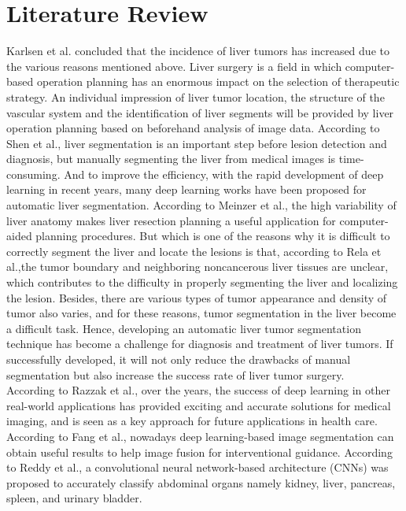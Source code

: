 \documentclass[12pt, a4paper]{article}
\begin{document}
\section{Literature Review}

\setlength{\parindent}{1em}
Karlsen et al.\cite{1} concluded that the incidence of liver tumors has increased due to the various reasons mentioned above. Liver surgery is a field in which computer-based operation planning has an enormous impact on the selection of therapeutic strategy. An individual impression of liver tumor location, the structure of the vascular system and the identification of liver segments will be provided by liver operation planning based on beforehand analysis of image data. According to Shen et al.\cite{2}, liver segmentation is an important step before lesion detection and diagnosis, but manually segmenting the liver from medical images is time-consuming. And to improve the efficiency, with the rapid development of deep learning in recent years, many deep learning works have been proposed for automatic liver segmentation. According to Meinzer et al.\cite{3}, the high variability of liver anatomy makes liver resection planning a useful application for computer-aided planning procedures. But which is one of the reasons why it is difficult to correctly segment the liver and locate the lesions is that, according to Rela et al.\cite{4},the tumor boundary and neighboring noncancerous liver tissues are unclear, which contributes to the difficulty in properly segmenting the liver and localizing the lesion. Besides, there are various types of tumor appearance and density of tumor also varies, and for these reasons, tumor segmentation in the liver become a difficult task. Hence, developing an automatic liver tumor segmentation technique has become a challenge for diagnosis and treatment of liver tumors. If successfully developed, it will not only reduce the drawbacks of manual segmentation but also increase the success rate of liver tumor surgery.\\

\setlength{\parindent}{1em}
According to Razzak et al.\cite{5}, over the years, the success of deep learning in other real-world applications has provided exciting and accurate solutions for medical imaging, and is seen as a key approach for future applications in health care.\\

\setlength{\parindent}{1em}
According to Fang et al.\cite{6}, nowadays deep learning-based image segmentation can obtain useful results to help image fusion for interventional guidance.
According to Reddy et al.\cite{7}, a convolutional neural network-based architecture (CNNs) was proposed to accurately classify abdominal organs namely kidney, liver, pancreas, spleen, and urinary bladder.\\
\end{document}
